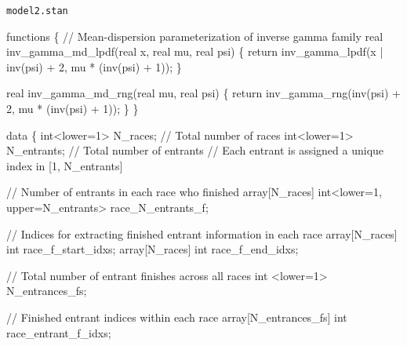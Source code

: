 \documentclass[
  letterpaper,
  DIV=11,
  numbers=noendperiod]{scrartcl}
\newenvironment{Shaded}{\begin{snugshade}}{\end{snugshade}}
\newcommand{\CommentTok}[1]{\textcolor[rgb]{0.37,0.37,0.37}{#1}}
\newcommand{\ControlFlowTok}[1]{\textcolor[rgb]{0.00,0.23,0.31}{#1}}
\newcommand{\DataTypeTok}[1]{\textcolor[rgb]{0.68,0.00,0.00}{#1}}
\newcommand{\DecValTok}[1]{\textcolor[rgb]{0.68,0.00,0.00}{#1}}
\newcommand{\KeywordTok}[1]{\textcolor[rgb]{0.00,0.23,0.31}{#1}}
\newcommand{\NormalTok}[1]{\textcolor[rgb]{0.00,0.23,0.31}{#1}}
\begin{document}
\begin{codelisting}

\caption{\texttt{model2.stan}}

\begin{Shaded}
\begin{Highlighting}[]
\KeywordTok{functions}\NormalTok{ \{}
  \CommentTok{// Mean{-}dispersion parameterization of inverse gamma family}
  \DataTypeTok{real}\NormalTok{ inv\_gamma\_md\_lpdf(}\DataTypeTok{real}\NormalTok{ x, }\DataTypeTok{real}\NormalTok{ mu, }\DataTypeTok{real}\NormalTok{ psi) \{}
    \ControlFlowTok{return}\NormalTok{ inv\_gamma\_lpdf(x | inv(psi) + }\DecValTok{2}\NormalTok{, mu * (inv(psi) + }\DecValTok{1}\NormalTok{));}
\NormalTok{  \}}

  \DataTypeTok{real}\NormalTok{ inv\_gamma\_md\_rng(}\DataTypeTok{real}\NormalTok{ mu, }\DataTypeTok{real}\NormalTok{ psi) \{}
    \ControlFlowTok{return}\NormalTok{ inv\_gamma\_rng(inv(psi) + }\DecValTok{2}\NormalTok{, mu * (inv(psi) + }\DecValTok{1}\NormalTok{));}
\NormalTok{  \}}
\NormalTok{\}}

\KeywordTok{data}\NormalTok{ \{}
  \DataTypeTok{int}\NormalTok{\textless{}}\KeywordTok{lower}\NormalTok{=}\DecValTok{1}\NormalTok{\textgreater{} N\_races;    }\CommentTok{// Total number of races}
  \DataTypeTok{int}\NormalTok{\textless{}}\KeywordTok{lower}\NormalTok{=}\DecValTok{1}\NormalTok{\textgreater{} N\_entrants; }\CommentTok{// Total number of entrants}
  \CommentTok{// Each entrant is assigned a unique index in [1, N\_entrants]}

  \CommentTok{// Number of entrants in each race who finished}
  \DataTypeTok{array}\NormalTok{[N\_races] }\DataTypeTok{int}\NormalTok{\textless{}}\KeywordTok{lower}\NormalTok{=}\DecValTok{1}\NormalTok{, }\KeywordTok{upper}\NormalTok{=N\_entrants\textgreater{} race\_N\_entrants\_f;}

  \CommentTok{// Indices for extracting finished entrant information in each race}
  \DataTypeTok{array}\NormalTok{[N\_races] }\DataTypeTok{int}\NormalTok{ race\_f\_start\_idxs;}
  \DataTypeTok{array}\NormalTok{[N\_races] }\DataTypeTok{int}\NormalTok{ race\_f\_end\_idxs;}

  \CommentTok{// Total number of entrant finishes across all races}
  \DataTypeTok{int}\NormalTok{ \textless{}}\KeywordTok{lower}\NormalTok{=}\DecValTok{1}\NormalTok{\textgreater{} N\_entrances\_fs;}

  \CommentTok{// Finished entrant indices within each race}
  \DataTypeTok{array}\NormalTok{[N\_entrances\_fs] }\DataTypeTok{int}\NormalTok{ race\_entrant\_f\_idxs;}


\end{Highlighting}
\end{Shaded}
\end{codelisting}
\end{document}
